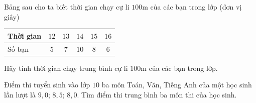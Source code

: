 \begin{bt}[H]%
	Bảng sau cho ta biết thời gian chạy cự li $100$m của các bạn trong lớp (đơn vị giây)
	\begin{center}
		\begin{tabular}{|l|c|c|c|c|c|}
			\hline
			Thời gian & $12$ & $13$ & $14$ & $15$ & $16$ \\
			\hline
			Số bạn & $5$ & $7$ & $10$ & $8$ & $6$\\
			\hline
		\end{tabular}
	\end{center}
	Hãy tính thời gian chạy trung bình cự li $100$m của các bạn trong lớp.
\end{bt}

\begin{bt}[N]%
	Điểm thi tuyển sinh vào lớp $10$ ba môn Toán, Văn, Tiếng Anh của một học sinh lần lượt là $9{,}0$; $8{,}5$; $8{,}0$. Tìm điểm thi trung bình ba môn thi của học sinh.
\end{bt}

